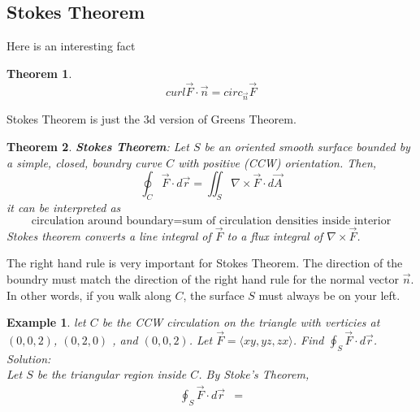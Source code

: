 \documentclass[11pt]{article}
\newtheorem{thm}{Theorem}
\newtheorem{ex}{Example}
\begin{document}
        \subsection{Stokes Theorem}
        Here is an interesting fact
        \begin{thm}
          \[curl \vec{F} \cdot \vec{n} = circ_{\vec{n}}\vec{F}\]
          \end{thm}
        Stokes Theorem is just the 3d version of Greens Theorem.
        \begin{thm}
          \textbf{\emph{Stok}es Theorem}: Let $S$ be an oriented smooth surface bounded by a simple, closed, boundry curve $C$
          with positive (CCW) orientation. Then,
          \[\oint_{C} \vec{F} \cdot d\vec{r} = \iint_{S} \nabla \times \vec{F} \cdot d\vec{A}\]
          it can be interpreted as
          \[\text{circulation around boundary} = \text{sum of circulation densities inside interior}\]
          Stokes theorem converts a line integral of $\vec{F}$ to a flux integral of $\nabla \times \vec{F}$.
        \end{thm}
        The right hand rule is very important for Stokes Theorem. The direction of the boundry must match
        the direction of the right hand rule for the normal vector $\vec{n}$. In other words, if you walk along $C$,
        the surface $S$ must always be on your left.
        \begin{ex}
          let $C$ be the CCW circulation on the triangle with verticies at $(0,0,2)$, $(0,2,0)$ , and $(0,0,2)$. Let
          $\vec{F} = \langle xy, yz, zx \rangle$. Find $\oint_{S} \vec{F} \cdot d\vec{r}$. \\
          Solution: \\
          Let $S$ be the triangular region inside $C$. By Stoke's Theorem,
          \begin{align*}
            \oint_{S} \vec{F} \cdot d\vec{r}
            &=
          \end{align*}
        \end{ex}
\end{document}
